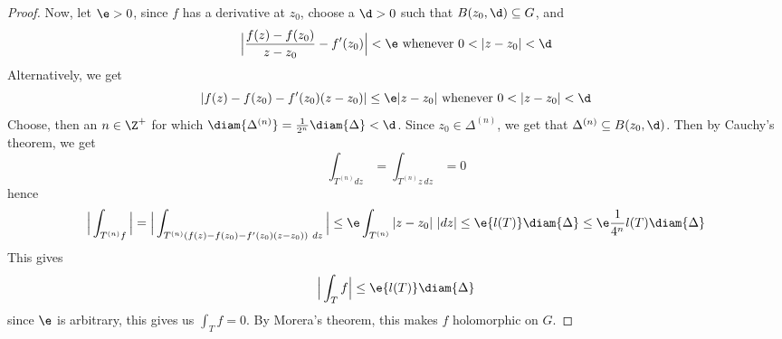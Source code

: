 \begin{proof}
    Now, let $\e>0$, since  $f$ has a derivative at  $z_0$, choose a $\d>0$ such
    that  $B(z_0,\d) \subseteq G$, and
    \begin{equation*}
        \Big{|} \frac{f(z)-f(z_0)}{z-z_0}-f'(z_0) \Big{|}<\e \text{ whenever }
        0<|z-z_0|<\d
    \end{equation*}
    Alternatively, we get
    \begin{equation*}
        |f(z)-f(z_0)-f'(z_0)(z-z_0)| \leq \e|z-z_0| \text{ whenever }
        0<|z-z_0|<\d
    \end{equation*}
    Choose, then an $n \in \Z^+$ for which
    $\diam{\Delta^{(n)}}=\frac{1}{2^n}\diam{\Delta}<\d$. Since $z_0 \in
    \Delta^{(n)}$, we get that $\Delta^{(n)} \subseteq B(z_0,\d)$. Then by
    Cauchy's theorem, we get
    \begin{equation*}
        \int_{T^{(n)}{dz}}=\int_{T^{(n)}{z \ dz}}=0
    \end{equation*}
    hence
    \begin{equation*}
        \Big{|} \int_{T^{(n)}{f}} \Big{|}=
        \Big{|} \int_{T^{(n)}{(f(z)-f(z_0)-f'(z_0)(z-z_0)) \ dz}} \Big{|} \leq
        \e\int_{T^{(n)}}{|z-z_0| \ |dz|} \leq \e{l(T)}\diam{\Delta} \leq
        \e\frac{1}{4^n}l(T)\diam{\Delta}
    \end{equation*}
    This gives
    \begin{equation*}
        \Big{|} \int_T{f} \Big{|} \leq \e{l(T)}\diam{\Delta}
    \end{equation*}
    since $\e$ is arbitrary, this gives us $\int_T{f}=0$. By Morera's theorem,
    this makes $f$ holomorphic on $G$.
\end{proof}
